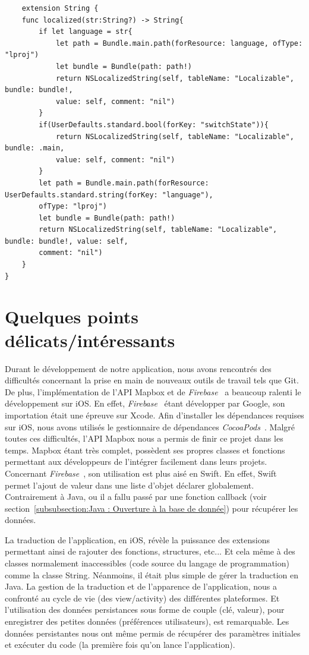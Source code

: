 \documentclass{article}
\begin{document}
\begin{verbatim}
    extension String {
    func localized(str:String?) -> String{
        if let language = str{
            let path = Bundle.main.path(forResource: language, ofType: "lproj")
            let bundle = Bundle(path: path!)
            return NSLocalizedString(self, tableName: "Localizable", bundle: bundle!,
            value: self, comment: "nil")
        }
        if(UserDefaults.standard.bool(forKey: "switchState")){
            return NSLocalizedString(self, tableName: "Localizable", bundle: .main,
            value: self, comment: "nil")
        }
        let path = Bundle.main.path(forResource: UserDefaults.standard.string(forKey: "language"), 
        ofType: "lproj")
        let bundle = Bundle(path: path!)
        return NSLocalizedString(self, tableName: "Localizable", bundle: bundle!, value: self,
        comment: "nil")
    }
}  
\end{verbatim}


\newpage %


\section{Quelques points délicats/intéressants}

Durant le développement de notre application, nous avons rencontrés des difficultés concernant la prise en main
de nouveaux outils de travail tels que Git.
De plus, l'implémentation de l'API Mapbox et de \textit{Firebase}~\cite{firebaseDoc} a beaucoup ralenti
le développement sur iOS. En effet, \textit{Firebase}~\cite{firebaseDoc} étant développer par Google, son importation
était une épreuve sur Xcode. Afin d'installer les dépendances requises sur iOS, nous avons utilisés
le gestionnaire de dépendances \textit{CocoaPods}~\cite{cocoapodsDoc}.
Malgré toutes ces difficultés, l'API Mapbox nous a permis de finir ce projet dans les temps.
Mapbox étant très complet, possèdent ses propres classes et fonctions permettant aux développeurs de l'intégrer facilement dans leurs projets.
Concernant \textit{Firebase}~\cite{firebaseDoc}, son utilisation est plus aisé en Swift. En effet, Swift permet
l'ajout de valeur dans une liste d'objet déclarer globalement. Contrairement à Java, ou il a fallu passé par une
fonction callback (voir section~\ref{subsubsection:Java : Ouverture à la base de donnée}) pour récupérer les données.

La traduction de l'application, en iOS, révèle la puissance des extensions permettant ainsi de rajouter des fonctions, structures, etc...
Et cela même à des classes normalement inaccessibles (code source du langage de programmation) comme la classe String. Néanmoins, il était plus simple de gérer la traduction en Java.
La gestion de la traduction et de l'apparence de l'application, nous a confronté au cycle de vie (des view/activity) des différentes plateformes.
Et l'utilisation des données persistances sous forme de couple (clé, valeur), pour enregistrer des petites données (préférences utilisateurs), est remarquable.
Les données persistantes nous ont même permis de récupérer des paramètres initiales et exécuter du code (la première fois qu'on lance l'application).
\end{document}
